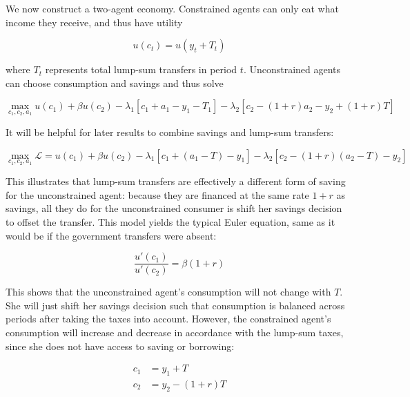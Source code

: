 \documentclass[12pt, letterpaper, parskip = full]{article}
\begin{document}
	\subsubsection{}

	We now construct a two-agent economy. Constrained agents can only eat what income they receive, and thus have utility 

	\[ u(c_t) = u(y_t + T_t) \]  

	where \(T_t\) represents total lump-sum transfers in period \(t\). Unconstrained agents can choose consumption and savings and thus solve

	\[ \max_{c_1, c_2, a_1} u(c_1) + \beta u(c_2) - \lambda_1 \left[ c_1 + a_1 - y_1 - T_1 \right] - \lambda_2 \left[ c_2 - (1+r) a_2 - y_2 + (1+r) T   \right] \]

	It will be helpful for later results to combine savings and lump-sum transfers:

	\[ \max_{c_1, c_2, a_1} \mathcal{L} = u(c_1) + \beta u(c_2) - \lambda_1 \left[ c_1 + (a_1 - T) - y_1 \right] - \lambda_2 \left[ c_2 - (1+r) (a_2 - T) - y_2  \right] \]

	This illustrates that lump-sum transfers are effectively a different form of saving for the unconstrained agent: because they are financed at the same rate \(1+r\) as savings, all they do for the unconstrained consumer is shift her savings decision to offset the transfer. This model yields the typical Euler equation, same as it would be if the government transfers were absent:

	\[  \frac{u'(c_1)}{u'(c_2)} = \beta (1+r)      \]

	This shows that the unconstrained agent's consumption will not change with \(T\). She will just shift her savings decision such that consumption is balanced across periods after taking the taxes into account. However, the constrained agent's consumption will increase and decrease in accordance with the lump-sum taxes, since she does not have access to saving or borrowing:

	\begin{align*}
	c_1 &= y_1 + T \\
	c_2 &= y_2 - (1+r) T
	\end{align*}
\end{document}
